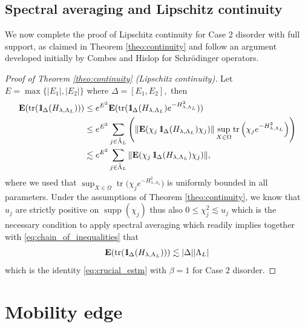 \documentclass[reqno,12pt,letterpaper]{amsart}
\numberwithin{equation}{section}
\DeclareMathOperator{\supp}{supp}
\DeclareMathOperator{\tr}{tr}
\def\indic{\operatorname{1\hskip-2.75pt\relax l}}
\begin{document}
\subsection{Spectral averaging and Lipschitz continuity}
\label{subsec:Lipschitz}
We now complete the proof of Lipschitz continuity for Case 2 disorder with full support, as claimed in Theorem \ref{theo:continuity} and follow an argument developed initially by Combes and Hislop \cite[Corr. $4.2$]{CH94} for Schrödinger operators.
\begin{proof}[Proof of Theorem \ref{theo:continuity} (Lipschitz continuity)]
Let $E =\max \{\vert E_1 \vert, \vert E_2 \vert\}$ where $\Delta = [E_1,E_2],$ then
\begin{equation}
\label{eq:chain_of_inequalities}
\begin{split}
 \mathbf E(\tr(\indic_\Delta(H_{\lambda,  \Lambda_L}))) 
 &\le e^{E^2} \mathbf E(\tr(\indic_\Delta(H_{\lambda,  \Lambda_L})e^{-H^2_{\lambda,  \Lambda_L}})) \\
  &\le e^{E^2} \sum_{j \in   \tilde \Lambda_L} \Bigg(\Vert \mathbf E(\chi_j \indic_\Delta(H_{\lambda, \Lambda_L}) \chi_j) \Vert \sup_{X \in \Omega} \tr\Big(   \chi_j e^{-H^2_{\lambda, \Lambda_L}}\Big)\Bigg) \\
 &\lesssim e^{E^2}  \sum_{j \in   \tilde \Lambda_L} \Vert \mathbf E( \chi_j \indic_\Delta(H_{\lambda, \Lambda_L}) \chi_j )\Vert,
\end{split}
\end{equation}
where we used that $\sup_{X \in \Omega} \tr\Big(   \chi_j e^{-H^2_{\lambda, \Lambda_L}}\Big)$ is uniformly bounded in all parameters.
Under the assumptions of Theorem \ref{theo:continuity}, we know that $u_j$ are strictly positive on $\supp(\chi_j)$ thus also $0 \le \chi_j^2 \lesssim u_j$ which is the necessary condition \cite[(4.2)]{CH94} to apply spectral averaging which readily implies together with \eqref{eq:chain_of_inequalities} that 
\begin{equation}
\label{eq:Lipschitz}
  \mathbf E(\tr(\indic_\Delta(H_{\lambda,  \Lambda_L})))  \lesssim \vert \Delta \vert \vert \Lambda_L\vert
  \end{equation}
which is the identity \eqref{eq:crucial_estm} with $\beta=1$ for Case $2$ disorder.
\end{proof}

\section{Mobility edge}
\label{sec:mob}
\end{document}
